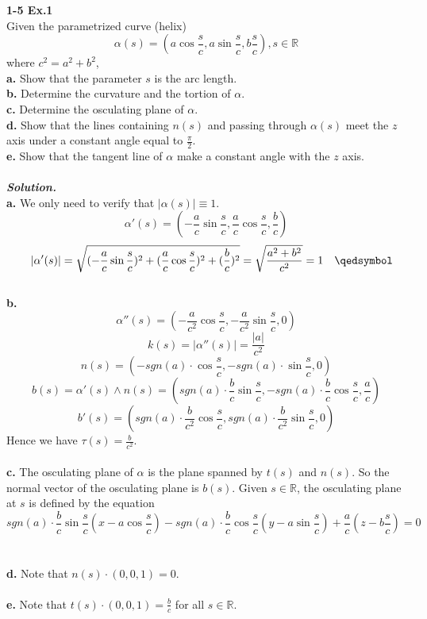 \documentclass{article}
\begin{document}
\par
\textbf{1-5 Ex.1}\\
Given the parametrized curve (helix)
$$
    \alpha(s) = (a \cos \frac{s}{c}, a \sin \frac{s}{c}, b \frac{s}{c}), s \in \mathbb{R}
$$
where $c^2 = a^2 + b^2$,\\
\textbf{a. } Show that the parameter $s$ is the arc length.\\
\textbf{b. } Determine the curvature and the tortion of $\alpha$.\\
\textbf{c. } Determine the osculating plane of $\alpha$.\\
\textbf{d. } Show that the lines containing $n(s)$ and passing through $\alpha(s)$
meet the $z$ axis under a constant angle equal to $\frac{\pi}{2}$.\\
\textbf{e. } Show that the tangent line of $\alpha$ make a constant angle with the $z$ axis.\\\\
\textbf{\textit{Solution.}}\\
\textbf{a. } We only need to verify that $|\alpha(s)| \equiv 1$.\\
$$
    \alpha'(s) = (-\frac{a}{c} \sin \frac{s}{c}, \frac{a}{c} \cos \frac{s}{c}, \frac{b}{c})
$$
$$
    \quad |\alpha'(s)| = \sqrt{(-\frac{a}{c} \sin \frac{s}{c})^2 + (\frac{a}{c} \cos \frac{s}{c})^2 + (\frac{b}{c})^2} = \sqrt{\frac{a^2+b^2}{c^2}} = 1 \quad \qedsymbol
$$
\\
\textbf{b. }
$$
    \alpha''(s) = (-\frac{a}{c^2} \cos \frac{s}{c}, -\frac{a}{c^2} \sin \frac{s}{c}, 0)
$$
$$
    k(s) = |\alpha''(s)| = \frac{|a|}{c^2}
$$
$$
    n(s) = (-sgn(a) \cdot \cos \frac{s}{c}, -sgn(a) \cdot \sin \frac{s}{c}, 0)
$$
$$
    b(s) = \alpha'(s) \wedge n(s) = (sgn(a) \cdot \frac{b}{c}\sin \frac{s}{c}, -sgn(a) \cdot \frac{b}{c} \cos \frac{s}{c}, \frac{a}{c})
$$
$$
    b'(s) = (sgn(a) \cdot \frac{b}{c^2}\cos \frac{s}{c}, sgn(a) \cdot \frac{b}{c^2} \sin \frac{s}{c}, 0)
$$
Hence we have $\tau(s) = \frac{b}{c^2}$. \quad \qedsymbol\\\\
\textbf{c. }The osculating plane of $\alpha$ is the plane spanned by $t(s)$ and $n(s)$.
So the normal vector of the osculating plane is $b(s)$. Given $s \in \mathbb{R}$, the osculating plane at $s$ is 
defined by the equation
$$
    sgn(a) \cdot \frac{b}{c}\sin \frac{s}{c}(x - a \cos \frac{s}{c}) - sgn(a) \cdot \frac{b}{c} \cos \frac{s}{c}(y - a \sin \frac{s}{c}) + \frac{a}{c}(z - b\frac{s}{c}) = 0
$$
\qedsymbol
\\\\
\textbf{d. }Note that $n(s) \cdot (0, 0, 1) = 0$. \quad \qedsymbol
\\\\
\textbf{e. }Note that $t(s) \cdot (0, 0, 1) = \frac{b}{c}$ for all $s \in \mathbb{R}$. \quad \qedsymbol
\end{document}
